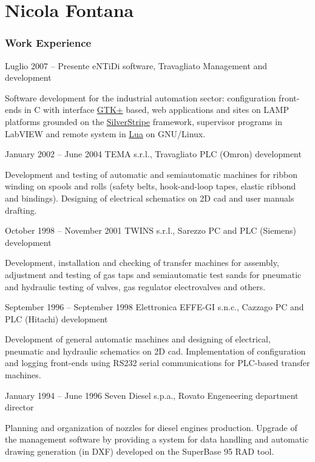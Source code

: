 \documentclass{tccv}
\begin{document}
\part{Nicola Fontana}

%
\begin{minipage}[t]{0.5\linewidth}
\vspace{0pt} %

\section{Work Experience}

\begin{eventlist}

\item{Luglio 2007 -- Presente}
     {eNTiDi software, Travagliato}
     {Management and development}

Software development for the industrial automation sector: configuration
front-ends in C with interface \href{http://www.gtk.org/}{GTK+} based,
web applications and sites on LAMP platforms grounded on the
\href{http://www.silverstripe.org/}{SilverStripe} framework,
supervisor programs in LabVIEW and remote system in
\href{http://www.lua.org/}{Lua} on GNU/Linux.

\item{January 2002 -- June 2004}
     {TEMA s.r.l., Travagliato}
     {PLC (Omron) development}

Development and testing of automatic and semiautomatic machines for
ribbon winding on spools and rolls (safety belts, hook-and-loop tapes,
elastic ribbond and bindings). Designing of electrical schematics on
2D cad and user manuals drafting.

\item{October 1998 -- November 2001}
     {TWINS s.r.l., Sarezzo}
     {PC and PLC (Siemens) development}

Development, installation and checking of transfer machines for
assembly, adjustment and testing of gas taps and semiautomatic test
sands for pneumatic and hydraulic testing of valves, gas regulator
electrovalves and others.

\item{September 1996 -- September 1998}
     {Elettronica EFFE-GI s.n.c., Cazzago}
     {PC and PLC (Hitachi) development}

Development of general automatic machines and designing of electrical,
pneumatic and hydraulic schematics on 2D cad. Implementation of
configuration and logging front-ends using RS232 serial communications
for PLC-based transfer machines.

\item{January 1994 -- June 1996}
     {Seven Diesel s.p.a., Rovato}
     {Engeneering department director}

Planning and organization of nozzles for diesel engines production.
Upgrade of the management software by providing a system for data
handling and automatic drawing generation (in DXF) developed on the
SuperBase 95 RAD tool.

\end{eventlist}
\end{minipage}
\end{document}
